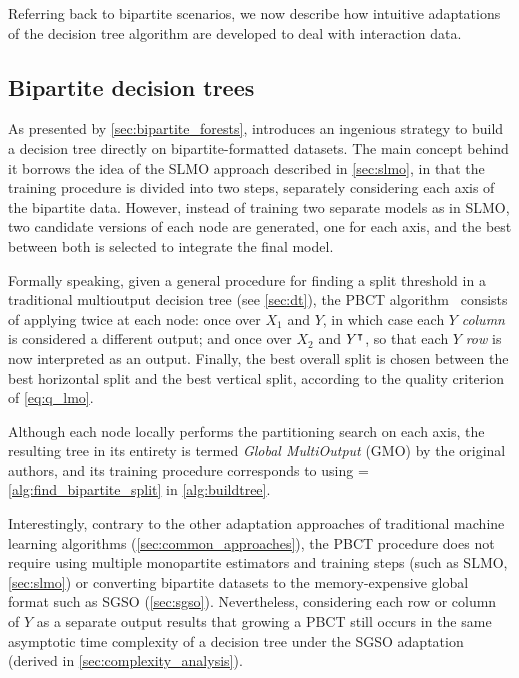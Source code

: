 Referring back to bipartite scenarios, we now describe how intuitive adaptations of the decision tree algorithm are developed to deal with interaction data.


\subsection{Bipartite decision trees}
\label{sec:bipartite_trees}

As presented by \autoref{sec:bipartite_forests}, \citet{pliakos2018global} introduces an ingenious strategy to build a decision tree directly on bipartite-formatted datasets. The main concept behind it borrows the idea of the SLMO approach described in \autoref{sec:slmo}, in that the training procedure is divided into two steps, separately considering each axis of the bipartite data. However, instead of training two separate models as in SLMO, two candidate versions of each node are generated, one for each axis, and the best between both is selected to integrate the final model.

Formally speaking, given a general procedure \FindSplit for finding a split threshold in a traditional multioutput decision tree (see \autoref{sec:dt}), the PBCT algorithm~\cite{pliakos2018global} consists of applying \FindSplit twice at each node: once over $X_1$ and $Y$, in which case each $Y$ \emph{column} is considered a different output; and once over $X_2$ and $Y^\intercal$, so that each $Y$ \emph{row} is now interpreted as an output. Finally, the best overall split is chosen between the best horizontal split and the best vertical split, according to the quality criterion of \autoref{eq:q_lmo}.

Although each node locally performs the partitioning search on each axis, the resulting tree in its entirety is termed \emph{Global MultiOutput} (GMO) by the original authors, and its training procedure corresponds to using \FindSplit = \ref{alg:find_bipartite_split} in \ref{alg:buildtree}.

\algFindBipartiteSplit

Interestingly, contrary to the other adaptation approaches of traditional machine learning algorithms (\autoref{sec:common_approaches}), the PBCT procedure does not require using multiple monopartite estimators and training steps (such as SLMO, \autoref{sec:slmo}) or converting bipartite datasets to the memory-expensive global format such as SGSO (\autoref{sec:sgso}). Nevertheless, considering each row or column of $Y$ as a separate output results that growing a PBCT still occurs in the same asymptotic time complexity of a decision tree under the SGSO adaptation (derived in \autoref{sec:complexity_analysis}). 

